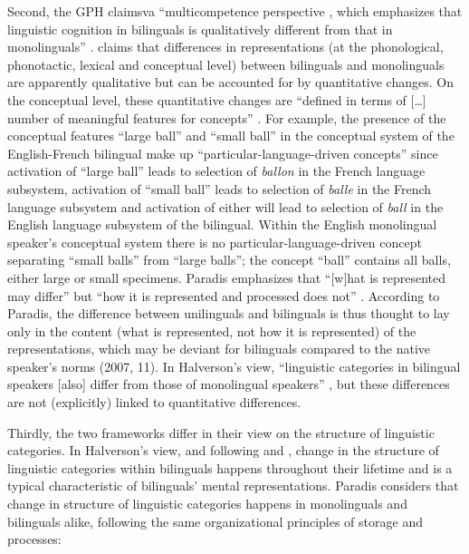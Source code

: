 Second, the GPH claimsva “multicompetence perspective \citep{cook_effects_2003}, which emphasizes that linguistic cognition in bilinguals is qualitatively different from that in monolinguals” \citep[12]{de_sutter_developing_2017}. \citet[22]{kecskes_neurofunctional_2007} claims that differences in representations (at the phonological, phonotactic, lexical and conceptual level) between bilinguals and monolinguals are apparently qualitative but can be accounted for by quantitative changes. On the conceptual level, these quantitative changes are “defined in terms of […] number of meaningful features for concepts” \citep[22]{kecskes_neurofunctional_2007}. For example, the presence of the conceptual features “large ball” and “small ball” in the conceptual system of the English-French bilingual make up “particular-language-driven concepts” \citep[23]{kecskes_neurofunctional_2007} since activation of “large ball” leads to selection of \textit{ballon} in the French language subsystem, activation of “small ball” leads to selection of \textit{balle} in the French language subsystem and activation of either will lead to selection of \textit{ball} in the English language subsystem of the bilingual. Within the English monolingual speaker’s conceptual system there is no particular-language-driven concept separating “small balls” from “large balls”; the concept “ball” contains all balls, either large or small specimens. Paradis emphasizes that “[w]hat is represented may differ” but “how it is represented and processed does not” \citep[22]{kecskes_neurofunctional_2007}. According to Paradis, the difference between unilinguals and bilinguals is thus thought to lay only in the content (what is represented, not how it is represented) of the representations, which may be deviant for bilinguals compared to the native speaker’s norms (2007, 11). In Halverson’s view, “linguistic categories in bilingual speakers [also] differ from those of monolingual speakers” \citep[12]{de_sutter_developing_2017}, but these differences are not (explicitly) linked to quantitative differences. 

Thirdly, the two frameworks differ in their view on the structure of linguistic categories. In Halverson’s view, and following \citet{cook_effects_2003} and \citet{cook_second_2011}, change in the structure of linguistic categories within bilinguals happens throughout their lifetime and is a typical characteristic of bilinguals’ mental representations. Paradis considers that change in structure of linguistic categories happens in monolinguals and bilinguals alike, following the same organizational principles of storage and processes:

